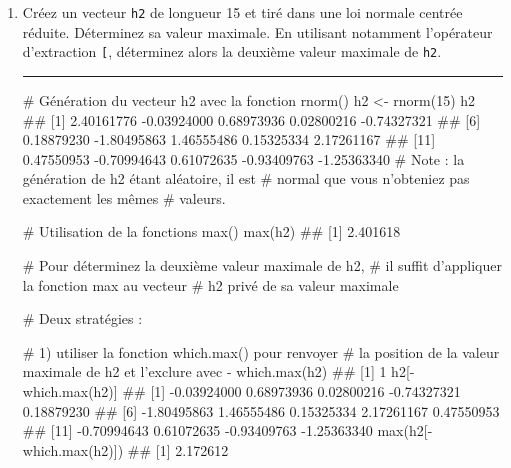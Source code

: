 \documentclass[12pt,twosided, notitlepage]{book}
\newenvironment{Shaded}{}{}
\newcommand{\KeywordTok}[1]{\textcolor[rgb]{0.00,0.00,1.00}{{#1}}}
\newcommand{\DecValTok}[1]{{#1}}
\newcommand{\StringTok}[1]{\textcolor[rgb]{0.00,0.50,0.50}{{#1}}}
\newcommand{\CommentTok}[1]{\textcolor[rgb]{0.00,0.50,0.00}{{#1}}}
\newcommand{\NormalTok}[1]{{#1}}
\newif \ifsol
\renewenvironment{Shaded}{\begin{snugshade}}{\end{snugshade}}
\begin{document}
\begin{enumerate}
  \begin{center} \rule{0.5\linewidth}{\linethickness}\end{center}

  \bigskip  \fi 
\item
  Créez un vecteur \texttt{h2} de longueur 15 et tiré dans une loi
  normale centrée réduite. Déterminez sa valeur
  maximale. En utilisant
  notamment l'opérateur d'extraction \texttt{{[}}, déterminez alors la
  deuxième valeur maximale de \texttt{h2}.

  \ifsol 

  \begin{center} \rule{0.5\linewidth}{\linethickness}\end{center}

\begin{Shaded}
\begin{Highlighting}[]
\CommentTok{# Génération du vecteur h2 avec la fonction rnorm()}
\NormalTok{h2 <-}\StringTok{ }\KeywordTok{rnorm}\NormalTok{(}\DecValTok{15}\NormalTok{)}
\NormalTok{h2}
  \NormalTok{##  [1]  2.40161776 -0.03924000  0.68973936  0.02800216 -0.74327321}
  \NormalTok{##  [6]  0.18879230 -1.80495863  1.46555486  0.15325334  2.17261167}
  \NormalTok{## [11]  0.47550953 -0.70994643  0.61072635 -0.93409763 -1.25363340}
\CommentTok{# Note : la génération de h2 étant aléatoire, il est}
\CommentTok{# normal que vous n'obteniez pas exactement les mêmes}
\CommentTok{# valeurs. }

\CommentTok{# Utilisation de la fonctions max()}
\KeywordTok{max}\NormalTok{(h2)}
  \NormalTok{## [1] 2.401618}

\CommentTok{# Pour déterminez la deuxième valeur maximale de h2,}
\CommentTok{# il suffit d'appliquer la fonction max au vecteur}
\CommentTok{# h2 privé de sa valeur maximale}

\CommentTok{# Deux stratégies : }

\CommentTok{# 1) utiliser la fonction which.max() pour renvoyer }
\CommentTok{# la position de la valeur maximale de h2 et l'exclure avec -}
\KeywordTok{which.max}\NormalTok{(h2)}
  \NormalTok{## [1] 1}
\NormalTok{h2[-}\KeywordTok{which.max}\NormalTok{(h2)]}
  \NormalTok{##  [1] -0.03924000  0.68973936  0.02800216 -0.74327321  0.18879230}
  \NormalTok{##  [6] -1.80495863  1.46555486  0.15325334  2.17261167  0.47550953}
  \NormalTok{## [11] -0.70994643  0.61072635 -0.93409763 -1.25363340}
\KeywordTok{max}\NormalTok{(h2[-}\KeywordTok{which.max}\NormalTok{(h2)])}
  \NormalTok{## [1] 2.172612}


\end{Highlighting}
\end{Shaded}
\end{enumerate}
\end{document}
